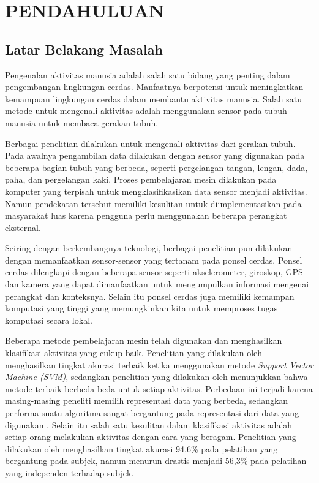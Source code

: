 \chapter{PENDAHULUAN}

\section{Latar Belakang Masalah}
Pengenalan aktivitas manusia adalah salah satu bidang yang penting dalam pengembangan lingkungan cerdas. Manfaatnya berpotensi untuk meningkatkan kemampuan lingkungan cerdas dalam membantu aktivitas manusia. Salah satu metode untuk mengenali aktivitas adalah menggunakan sensor pada tubuh manusia untuk membaca gerakan tubuh.

Berbagai penelitian dilakukan untuk mengenali aktivitas dari gerakan tubuh. Pada awalnya pengambilan data dilakukan dengan sensor yang digunakan pada beberapa bagian tubuh yang berbeda, seperti pergelangan tangan, lengan, dada, paha, dan pergelangan kaki. Proses pembelajaran mesin dilakukan pada komputer yang terpisah untuk mengklasifikasikan data sensor menjadi aktivitas. Namun pendekatan tersebut memiliki kesulitan untuk diimplementasikan pada masyarakat luas karena pengguna perlu menggunakan beberapa perangkat eksternal.

Seiring dengan berkembangnya teknologi, berbagai penelitian pun dilakukan dengan memanfaatkan sensor-sensor yang tertanam pada ponsel cerdas. Ponsel cerdas dilengkapi dengan beberapa sensor seperti akselerometer, giroskop, GPS dan kamera yang dapat dimanfaatkan untuk mengumpulkan informasi mengenai perangkat dan konteksnya. Selain itu ponsel cerdas juga memiliki kemampan komputasi yang tinggi yang memungkinkan kita untuk memproses tugas komputasi secara lokal.

Beberapa metode pembelajaran mesin telah digunakan dan menghasilkan klasifikasi aktivitas yang cukup baik. Penelitian yang dilakukan oleh \Textcite{Chiang-201413} menghasilkan tingkat akurasi terbaik ketika menggunakan metode \textit{Support Vector Machine (SVM)}, sedangkan penelitian yang dilakukan oleh \Textcite{shoaib-2013} menunjukkan bahwa metode terbaik berbeda-beda untuk setiap aktivitas. Perbedaan ini terjadi karena masing-masing peneliti memilih representasi data yang berbeda, sedangkan performa suatu algoritma sangat bergantung pada representasi dari data yang digunakan \Parencite{Goodfellow-2016}. Selain itu salah satu kesulitan dalam klasifikasi aktivitas adalah setiap orang melakukan aktivitas dengan cara yang beragam. Penelitian yang dilakukan oleh \Textcite{tapia-2007} menghasilkan tingkat akurasi 94,6\% pada pelatihan yang bergantung pada subjek, namun menurun drastis menjadi 56,3\% pada pelatihan yang independen terhadap subjek.

